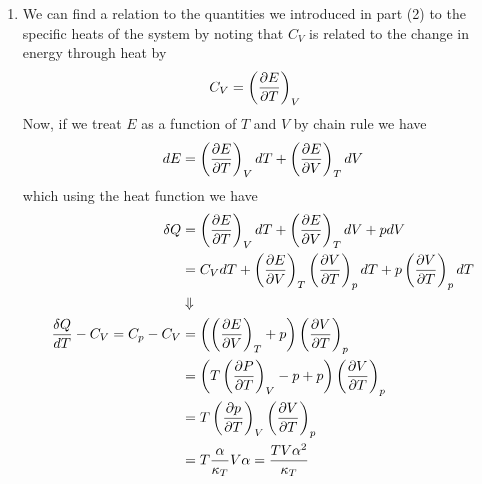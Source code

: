 \documentclass[11pt]{article}
\numberwithin{equation}{section}
\begin{document}
\begin{enumerate}[(1)]
\item We can find a relation to the quantities we introduced in part (2) to the specific 
heats of the system by noting that $C_V$ is related to the change in energy through heat by
\begin{align*}
C_V &= \left(\frac{\partial{E}}{\partial{T}}\right)_{V}
\end{align*}
Now, if we treat $E$ as a function of $T$ and $V$ by chain rule we have
$$dE = \left(\frac{\partial{E}}{\partial{T}}\right)_{V}dT + \left(\frac{\partial{E}}{\partial{V}}\right)_{T}dV$$
which using the heat function we have
\begin{align*}
\delta{Q} &= \left(\frac{\partial{E}}{\partial{T}}\right)_{V}dT + \left(\frac{\partial{E}}{\partial{V}}\right)_{T}dV + pdV\\
&= C_VdT + \left(\frac{\partial{E}}{\partial{V}}\right)_{T}\left(\frac{\partial{V}}{\partial{T}}\right)_{p}dT + p\left(\frac{\partial{V}}{\partial{T}}\right)_{p}dT\\
&\Downarrow\\
\frac{\delta{Q}}{dT} -C_V = C_p - C_V &= \left(\left(\frac{\partial{E}}{\partial{V}}\right)_{T} + p\right)\left(\frac{\partial{V}}{\partial{T}}\right)_{p}\\
&= \left(T\left(\frac{\partial{P}}{\partial{T}}\right)_{V} - p + p\right)\left(\frac{\partial{V}}{\partial{T}}\right)_{p}\\
&= T\left(\frac{\partial{p}}{\partial{T}}\right)_{V}\left(\frac{\partial{V}}{\partial{T}}\right)_{p}\\
&= T\frac{\alpha}{\kappa_T}V\alpha = \frac{TV\alpha^2}{\kappa_T}
\end{align*}
\end{enumerate}

\pagebreak
\end{document}
